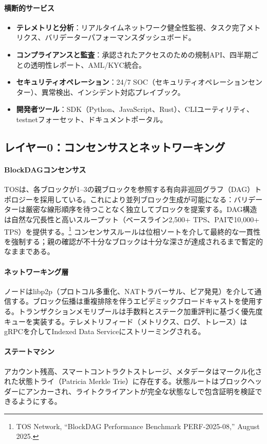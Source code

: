 \documentclass[11pt]{article}
\begin{document}
\paragraph{横断的サービス}
\begin{itemize}[noitemsep]
  \item \textbf{テレメトリと分析}：リアルタイムネットワーク健全性監視、タスク完了メトリクス、バリデーターパフォーマンスダッシュボード。
  \item \textbf{コンプライアンスと監査}：承認されたアクセスのための規制API、四半期ごとの透明性レポート、AML/KYC統合。
  \item \textbf{セキュリティオペレーション}：24/7 SOC（セキュリティオペレーションセンター）、異常検出、インシデント対応プレイブック。
  \item \textbf{開発者ツール}：SDK（Python、JavaScript、Rust）、CLIユーティリティ、testnetフォーセット、ドキュメントポータル。
\end{itemize}

\subsection{レイヤー0：コンセンサスとネットワーキング}
\paragraph{BlockDAGコンセンサス} TOSは、各ブロックが1--3の親ブロックを参照する有向非巡回グラフ（DAG）トポロジーを採用している。これにより並列ブロック生成が可能になる：バリデーターは厳密な線形順序を待つことなく独立してブロックを提案する。DAG構造は自然な冗長性と高いスループット（ベースライン2,500+ TPS、PAIで10,000+ TPS）を提供する。\footnote{TOS Network, ``BlockDAG Performance Benchmark PERF-2025-08,'' August 2025.} コンセンサスルールは位相ソートを介して最終的な一貫性を強制する；親の確認が不十分なブロックは十分な深さが達成されるまで暫定的なままである。

\paragraph{ネットワーキング層} ノードはlibp2p（プロトコル多重化、NATトラバーサル、ピア発見）を介して通信する。ブロック伝播は重複排除を伴うエピデミックブロードキャストを使用する。トランザクションメモリプールは手数料とステーク加重評判に基づく優先度キューを実装する。テレメトリフィード（メトリクス、ログ、トレース）はgRPCを介してIndexed Data Serviceにストリーミングされる。

\paragraph{ステートマシン} アカウント残高、スマートコントラクトストレージ、メタデータはマークル化された状態トライ（Patricia Merkle Trie）に存在する。状態ルートはブロックヘッダーにアンカーされ、ライトクライアントが完全な状態なしで包含証明を検証できるようにする。
\end{document}
